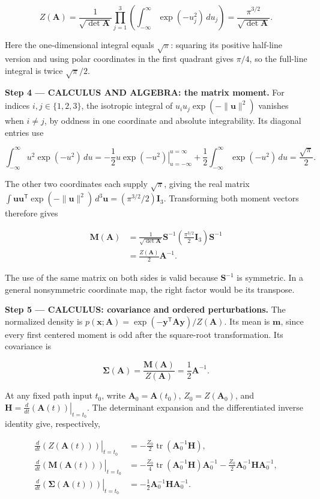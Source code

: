 \documentclass[11pt,oneside,openany]{book}
\begin{document}
\[
Z(\mathbf A)=\frac{1}{\sqrt{\det\mathbf A}}
\prod_{j=1}^3\left(\int_{-\infty}^{\infty}\exp(-u_j^2)\,du_j\right)
=\frac{\pi^{3/2}}{\sqrt{\det\mathbf A}}.
\]

Here the one-dimensional integral equals \(\sqrt\pi\): squaring its positive half-line version and using polar coordinates in the first quadrant gives \(\pi/4\), so the full-line integral is twice \(\sqrt\pi/2\).

\textbf{Step 4 --- CALCULUS AND ALGEBRA: the matrix moment.} For indices \(i,j\in\{1,2,3\}\), the isotropic integral of \(u_i u_j\exp(-\|\mathbf u\|^2)\) vanishes when \(i\ne j\), by oddness in one coordinate and absolute integrability. Its diagonal entries use

\[
\int_{-\infty}^{\infty}u^2\exp(-u^2)\,du
=-\frac12\left.u\exp(-u^2)\right|_{u=-\infty}^{u=\infty}
+\frac12\int_{-\infty}^{\infty}\exp(-u^2)\,du
=\frac{\sqrt\pi}{2}.
\]

The other two coordinates each supply \(\sqrt\pi\), giving the real matrix \(\int\mathbf u\mathbf u^{\mathsf T}\exp(-\|\mathbf u\|^2)\,d^3\mathbf u=(\pi^{3/2}/2)\mathbf I_3\). Transforming both moment vectors therefore gives

\[
\begin{aligned}
\mathbf M(\mathbf A)
&=\frac{1}{\sqrt{\det\mathbf A}}\mathbf S^{-1}
\left(\frac{\pi^{3/2}}2\mathbf I_3\right)\mathbf S^{-1}\\
&=\frac{Z(\mathbf A)}2\mathbf A^{-1}.
\end{aligned}
\]

The use of the same matrix on both sides is valid because \(\mathbf S^{-1}\) is symmetric. In a general nonsymmetric coordinate map, the right factor would be its transpose.

\textbf{Step 5 --- CALCULUS: covariance and ordered perturbations.} The normalized density is \(p(\mathbf x;\mathbf A)=\exp(-\mathbf y^{\mathsf T}\mathbf A\mathbf y)/Z(\mathbf A)\). Its mean is \(\mathbf m\), since every first centered moment is odd after the square-root transformation. Its covariance is

\[
\boldsymbol\Sigma(\mathbf A)=\frac{\mathbf M(\mathbf A)}{Z(\mathbf A)}
=\frac12\mathbf A^{-1}.
\]

At any fixed path input \(t_0\), write \(\mathbf A_0=\mathbf A(t_0)\), \(Z_0=Z(\mathbf A_0)\), and \(\mathbf H=\left.\frac{d}{dt}(\mathbf A(t))\right|_{t=t_0}\). The determinant expansion and the differentiated inverse identity give, respectively,

\[
\begin{aligned}
\left.\frac{d}{dt}(Z(\mathbf A(t)))\right|_{t=t_0}
&=-\frac{Z_0}{2}\operatorname{tr}(\mathbf A_0^{-1}\mathbf H),\\
\left.\frac{d}{dt}(\mathbf M(\mathbf A(t)))\right|_{t=t_0}
&=-\frac{Z_0}{4}\operatorname{tr}(\mathbf A_0^{-1}\mathbf H)\mathbf A_0^{-1}
-\frac{Z_0}{2}\mathbf A_0^{-1}\mathbf H\mathbf A_0^{-1},\\
\left.\frac{d}{dt}(\boldsymbol\Sigma(\mathbf A(t)))\right|_{t=t_0}
&=-\frac12\mathbf A_0^{-1}\mathbf H\mathbf A_0^{-1}.
\end{aligned}
\]
\end{document}
